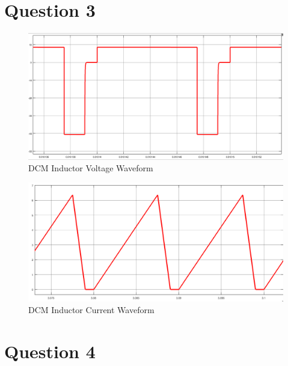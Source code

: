 \documentclass[oneside,12pt]{article}
\begin{document}
\newpage\section{Question 3}

\begin{figure}[H]
	\centering
	\includegraphics[scale=0.5]{q3/VL}
	\caption{DCM Inductor Voltage Waveform}
	\label{fig:vl}
\end{figure}
\begin{figure}[H]
	\centering
	\includegraphics[scale=0.5]{q3/IL}
	\caption{DCM Inductor Current Waveform}
	\label{fig:il}
\end{figure}


\newpage\section{Question 4}
\end{document}
